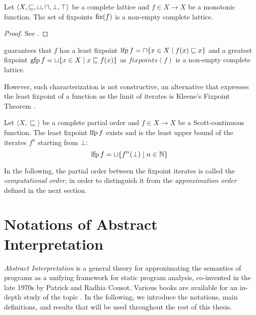 \begin{theorem}
  Let $\langle X, \sqsubseteq, \sqcup, \sqcap, \bot, \top \rangle$ be a complete lattice and $f \in X \to X$ be a monotonic function. The set of fixpoints $\textup{fix}(f)$ is a non-empty complete lattice.
\end{theorem}
\begin{proof}
  See \textcite{Tarski1955}.
\end{proof}
 guarantees that $f$ has a least fixpoint $\operatorname{lfp} f = \sqcap \{x \in X \mid f(x) \sqsubseteq x\}$ and a greatest fixpoint $\operatorname{gfp} f = \sqcup \{x \in X \mid x \sqsubseteq f(x)\}$ as $fixpoints(f)$ is a non-empty complete lattice.

However, such characterization is not constructive, an alternative that expresses the least fixpoint of a function as the limit of iterates is Kleene's Fixpoint Theorem .


\begin{theorem}
  Let $\langle X, \sqsubseteq \rangle$ be a complete partial order and $f \in X \to X$ be a Scott-continuous function. The least fixpoint $\operatorname{lfp} f$ exists and is the least upper bound of the iterates $f^n$ starting from $\bot$:
  \[ \operatorname{lfp} f = \sqcup \{f^n(\bot) \mid n \in \mathbb{N}\} \]
\end{theorem}

In the following, the partial order between the fixpoint iterates is called the \emph{computational order}, in order to distinguish it from the \emph{approximation order} defined in the next section.


\section{Notations of Abstract Interpretation}

\emph{Abstract Interpretation}  is a general theory for approximating the semantics of programs as a unifying framework for static program analysis, co-invented in the late 1970s by Patrick and Radhia Cousot.
Various books are available for an in-depth study of the topic .
In the following, we introduce the notations, main definitions, and results that will be used throughout the rest of this thesis.


